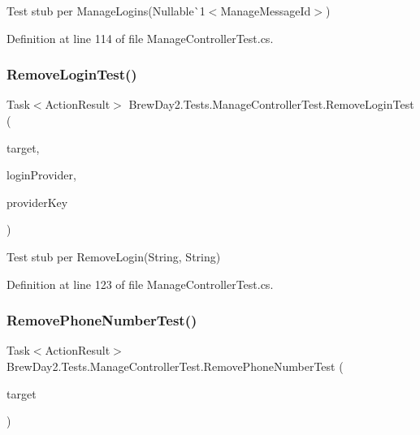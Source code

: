 Test stub per Manage\+Logins(Nullable\`{}1$<$Manage\+Message\+Id$>$)



Definition at line 114 of file Manage\+Controller\+Test.\+cs.

\mbox{\label{class_brew_day2_1_1_tests_1_1_manage_controller_test_aa23d7412cfef8dd01b2a836cfd018265}} 
\subsubsection{\texorpdfstring{Remove\+Login\+Test()}{RemoveLoginTest()}}
{\footnotesize\ttfamily Task$<$Action\+Result$>$ Brew\+Day2.\+Tests.\+Manage\+Controller\+Test.\+Remove\+Login\+Test (\begin{DoxyParamCaption}\item[{\mbox{[}\+Pex\+Assume\+Under\+Test\mbox{]} \mbox{\hyperlink{class_brew_day2_1_1_controllers_1_1_manage_controller}{Manage\+Controller}}}]{target,  }\item[{string}]{login\+Provider,  }\item[{string}]{provider\+Key }\end{DoxyParamCaption})}



Test stub per Remove\+Login(\+String, String)



Definition at line 123 of file Manage\+Controller\+Test.\+cs.

\mbox{\label{class_brew_day2_1_1_tests_1_1_manage_controller_test_a746f27b8cb41891df480fd36d6a0dcfd}} 
\subsubsection{\texorpdfstring{Remove\+Phone\+Number\+Test()}{RemovePhoneNumberTest()}}
{\footnotesize\ttfamily Task$<$Action\+Result$>$ Brew\+Day2.\+Tests.\+Manage\+Controller\+Test.\+Remove\+Phone\+Number\+Test (\begin{DoxyParamCaption}\item[{\mbox{[}\+Pex\+Assume\+Under\+Test\mbox{]} \mbox{\hyperlink{class_brew_day2_1_1_controllers_1_1_manage_controller}{Manage\+Controller}}}]{target }\end{DoxyParamCaption})}



